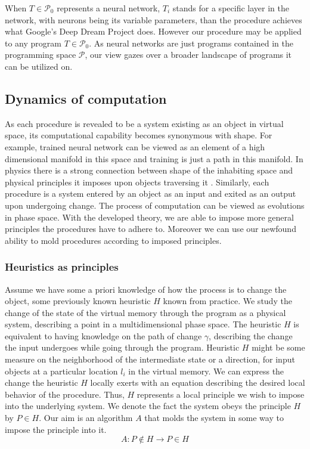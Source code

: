 \documentclass[preprint,12pt]{elsarticle}
\newcommand{\dP}{\mathcal{P}}
\begin{document}
   When $T\in\dP_0$ represents a neural network, $T_i$ stands for a specific layer in the network, with neurons being its variable parameters, than the procedure achieves what Google's Deep Dream Project \cite{DeepDream} does. However our procedure may be applied to any program $T\in\dP_0$. As neural networks are just programs contained in the programming space $\dP$, our view gazes over a broader landscape of programs it can be utilized on.
   
\subsection{Dynamics of computation}\label{sec:dynamComp}

As each procedure is revealed to be a system existing as an object in virtual space, its computational capability becomes synonymous with shape. For example, trained neural network can be viewed as an element of a high dimensional manifold in this space and training is just a path in this manifold.
In physics there is a strong connection between shape of the inhabiting space and physical principles it imposes upon objects traversing it \cite{GeneralCovariance}. Similarly, each procedure is a system entered by an object as an input and exited as an output upon undergoing change. The process of computation can be viewed as evolutions in phase space.
With the developed theory, we are able to impose more general principles the procedures have to adhere to. Moreover we can use our newfound ability to mold procedures according to imposed principles.

\subsubsection{Heuristics as principles}
 
 Assume we have some a priori knowledge of how the process is to change the object, some previously known heuristic $H$ known from practice. We study the change of the state of the virtual memory through the program as a physical system, describing a point in a multidimensional phase space. %
 The heuristic $H$ is equivalent to having knowledge on the path of change $\gamma$, describing the change the input undergoes while going through the program. Heuristic $H$ might be some measure on the neighborhood of the intermediate state or a direction, for input objects at a particular location $l_i$ in the virtual memory. We can express the change the heuristic $H$ locally exerts with an equation describing the desired local behavior of the procedure. 
Thus, $H$ represents a local principle we wish to impose into the underlying system. We denote the fact the system obeys the principle $H$ by $P\in H$. Our aim is an algorithm $A$ that molds the system in some way to impose the principle into it.
\begin{equation}\label{eq:impose}
A:P\notin H\to P\in H
\end{equation}
\end{document}
